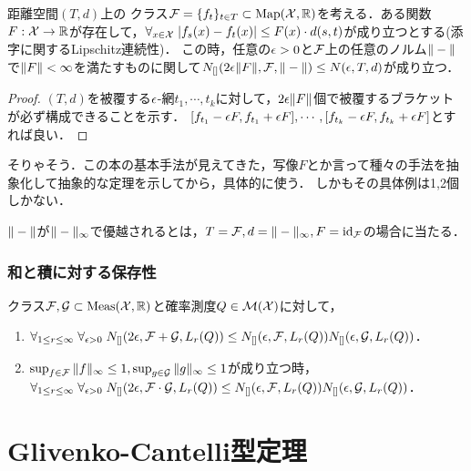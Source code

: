 \documentclass[uplatex,dvipdfmx]{jsreport}
\begin{document}
\begin{theorem}\label{thm-bracket-number-for-Lischitz-class}
    距離空間$(T,d)$上の
    クラス$\mathcal{F}=\{f_t\}_{t\in T}\subset\mathrm{Map}(\mathcal{X},\mathbb{R})$を考える．ある関数$F:\mathcal{X}\to\mathbb{R}$が存在して，$\forall_{x\in\mathcal{X}}\;\lvert f_s(x)-f_t(x)\rvert\le F(x)\cdot d(s,t)$が成り立つとする(添字に関するLipschitz連続性)．
    この時，任意の$\epsilon>0$と$\mathcal{F}$上の任意のノルム$\|-\|$で$\|F\|<\infty$を満たすものに関して$N_{[]}(2\epsilon\|F\|,\mathcal{F},\|-\|)\le N(\epsilon,T,d)$が成り立つ．
\end{theorem}
\begin{proof}
    $(T,d)$を被覆する$\epsilon$-網$t_1,\cdots,t_k$に対して，$2\epsilon\|F\|$個で被覆するブラケットが必ず構成できることを示す．
    $[f_{t_1}-\epsilon F,f_{t_1}+\epsilon F],\cdots,[f_{t_k}-\epsilon F,f_{t_k}+\epsilon F]$とすれば良い．
\end{proof}
\begin{remarks}
    そりゃそう．この本の基本手法が見えてきた，写像$F$とか言って種々の手法を抽象化して抽象的な定理を示してから，具体的に使う．
    しかもその具体例は1,2個しかない．
\end{remarks}
\begin{remark}
    $\|-\|$が$\|-\|_\infty$で優越されるとは，$T=\mathcal{F},d=\|-\|_\infty,F=\mathrm{id}_{\mathcal{F}}$の場合に当たる．
\end{remark}

\subsubsection{和と積に対する保存性}

\begin{lemma}
    クラス$\mathcal{F},\mathcal{G}\subset\mathrm{Meas}(\mathcal{X},\mathbb{R})$と確率測度$Q\in\mathcal{M}(\mathcal{X})$に対して，
    \begin{enumerate}
        \item $\forall_{1\le r\le\infty}\;\forall_{\epsilon>0}\;N_{[]}(2\epsilon,\mathcal{F}+\mathcal{G},L_r(Q))\le N_{[]}(\epsilon,\mathcal{F},L_r(Q))N_{[]}(\epsilon,\mathcal{G},L_r(Q))$．
        \item $\sup_{f\in\mathcal{F}}\|f\|_\infty\le 1,\sup_{g\in\mathcal{G}}\|g\|_\infty\le 1$が成り立つ時，$\forall_{1\le r\le\infty}\;\forall_{\epsilon>0}\;N_{[]}(2\epsilon,\mathcal{F}\cdot\mathcal{G},L_r(Q))\le N_{[]}(\epsilon,\mathcal{F},L_r(Q))N_{[]}(\epsilon,\mathcal{G},L_r(Q))$．
    \end{enumerate}
\end{lemma}

\section{Glivenko-Cantelli型定理}
\end{document}
